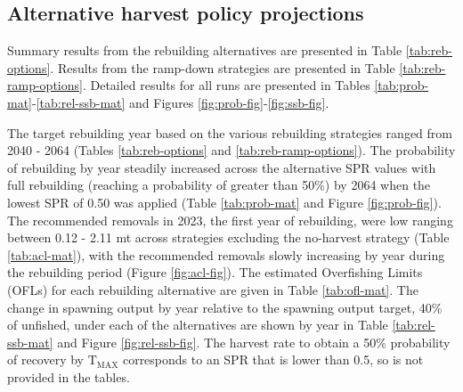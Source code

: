 \documentclass[11pt,
  english,
  letterpaper,
]{article}
\begin{document}

\hypertarget{alternative-harvest-policy-projections}{%
\subsection{Alternative harvest policy projections}\label{alternative-harvest-policy-projections}}

\leavevmode\tagmcend\tagstructend


Summary results from the rebuilding alternatives are presented in Table \ref{tab:reb-options}. Results from the ramp-down strategies are presented in Table \ref{tab:reb-ramp-options}. Detailed results for all runs are presented in Tables \ref{tab:prob-mat}-\ref{tab:rel-ssb-mat} and Figures \ref{fig:prob-fig}-\ref{fig:ssb-fig}.

\leavevmode\tagmcend\tagstructend\par


The target rebuilding year based on the various rebuilding strategies ranged from 2040 - 2064 (Tables \ref{tab:reb-options} and \ref{tab:reb-ramp-options}). The probability of rebuilding by year steadily increased across the alternative SPR values with full rebuilding (reaching a probability of greater than 50\%) by 2064 when the lowest SPR of 0.50 was applied (Table \ref{tab:prob-mat} and Figure \ref{fig:prob-fig}). The recommended removals in 2023, the first year of rebuilding, were low ranging between 0.12 - 2.11 mt across strategies excluding the no-harvest strategy (Table \ref{tab:acl-mat}), with the recommended removals slowly increasing by year during the rebuilding period (Figure \ref{fig:acl-fig}). The estimated Overfishing Limits (OFLs) for each rebuilding alternative are given in Table \ref{tab:ofl-mat}. The change in spawning output by year relative to the spawning output target, 40\% of unfished, under each of the alternatives are shown by year in Table \ref{tab:rel-ssb-mat} and Figure \ref{fig:rel-ssb-fig}. The harvest rate to obtain a 50\% probability of recovery by {\(\text{T}_\text{MAX}\)\leavevmode\tagmcend\tagstructend} corresponds to an SPR that is lower than 0.5, so is not provided in the tables.

\leavevmode\tagmcend\tagstructend\par
\end{document}
